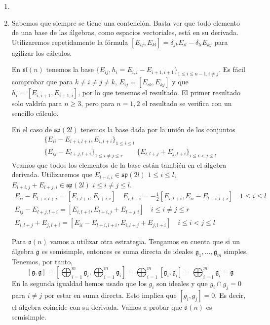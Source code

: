 \documentclass[twoside]{article}
\begin{document}
\begin{solucion}
\begin{enumerate}
\item[]
\item Sabemos que siempre se tiene una contención. Basta ver que todo elemento de una base de las álgebras, como espacios vectoriales, está en su derivada. Utilizaremos repetidamente la fórmula $[E_{ij},E_{kl}]=\delta_{jk}E_{il}-\delta_{li}E_{kj}$ para agilizar los cálculos.

En $\mathfrak{sl}(n)$ tenemos la base $\{E_{ij}, h_i=E_{i,i}-E_{i+1,i+1}\}_{1\leq i\leq n-1, i\neq j}$. Es fácil comprobar que para $k\neq i\neq j\neq k$, $E_{ij}=[E_{ik},E_{kj}]$ y que $h_i=[E_{i,i+1},E_{i+1,i}]$, por lo que tenemos el resultado. El primer resultado solo valdría para $n\geq 3$, pero para $n=1,2$ el resultado se verifica con un sencillo cálculo.

En el caso de $\mathfrak{sp}(2l)$ tenemos la base dada por la unión de los conjuntos
\begin{gather*}
\{E_{ii}-E_{l+i,l+i}, E_{i,l+i}\}_{1\leq i \leq l} \\
\{E_{ij}-E_{l+j,l+i}\}_{1\leq i\neq j\leq r} \qquad \{E_{i,l+j}+E_{j,l+i}\}_{i\leq i<j\leq l}
\end{gather*}
Veamos que todos los elementos de la base están también en el álgebra derivada. Utilizaremos que $E_{l+i,i} \in \mathfrak{sp}(2l)$ $1\leq i \leq l$, $E_{l+i,j}+E_{l+j,i} \in \mathfrak{sp}(2l)$ $i \leq i\neq j \leq l$.
\begin{gather*}
E_{ii}-E_{l+i,l+i}=[E_{i,l+i},E_{l+i,i}] \quad E_{i,l+i} = -\frac{1}{2}[E_{i,l+i},E_{ii}-E_{l+i,l+i}] \quad 1\leq i \leq l\\
E_{ij}-E_{l+j,l+i}=[E_{i,l+i},E_{l+i,j}+E_{l+j,i}] \quad i \leq i \neq j \leq r\\
E_{i,l+j}+E_{j,l+i}=[E_{ii}-E_{l+i,l+i},E_{i,l+j}+E_{j,l+i}]\quad i \leq i < j \leq l
\end{gather*}

Para $\mathfrak{o}(n)$ vamos a utilizar otra estrategia. Tengamos en cuenta que si un álgebra $\mathfrak{g}$ es semisimple, entonces es suma directa de ideales $\mathfrak{g}_1,\dotsc,\mathfrak{g}_m$ simples. Tenemos, por tanto,
$$
[\mathfrak{g},\mathfrak{g}] = \left[\bigoplus_{i=1}^m \mathfrak{g}_i,\bigoplus_{i=1}^m \mathfrak{g}_i\right] = \bigoplus_{i=1}^m [\mathfrak{g}_i,\mathfrak{g}_i] =\bigoplus_{i=1}^m \mathfrak{g}_i = \mathfrak{g}
$$
En la segunda igualdad hemos usado que los $g_i$ son ideales y que $g_i\cap g_j=0$ para $i\neq j$ por estar en suma directa. Esto implica que $[g_i,g_j]=0$. Es decir, el álgebra coincide con su derivada. Vamos a probar que $\mathfrak{o}(n)$ es semisimple.


\end{enumerate}
\end{solucion}
\end{document}
